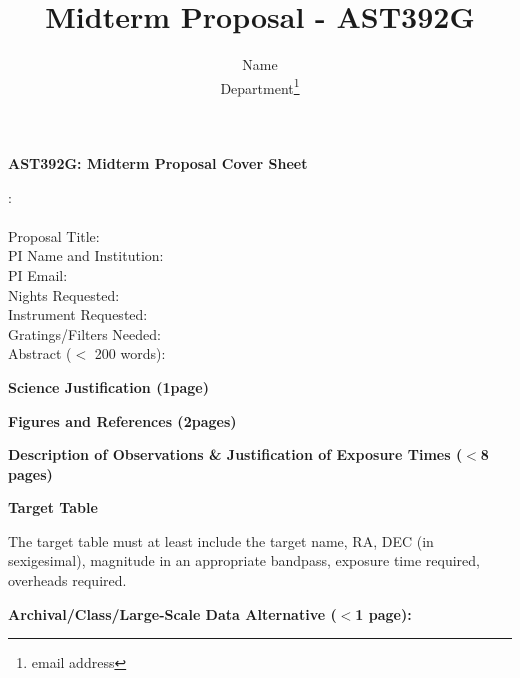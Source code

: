 \documentclass[11pt]{article}
\title{Midterm Proposal - AST392G}
\author{ Name\\  Department\thanks{email address} }
\begin{document}
\begin{center} {\bf \large AST392G: Midterm Proposal Cover Sheet} \end{center}: \\ \\


Proposal Title:  \\

PI Name and Institution:  \\

PI Email:  \\

Nights Requested:  \\

Instrument Requested:  \\

Gratings/Filters Needed:  \\

Abstract ($<$ 200 words):  \\

\pagebreak



\begin{center}{\bf Science Justification (1page)}\end{center}

\newpage
\begin{center}{\bf Figures  and References (2pages) }\end{center}

\newpage
\begin{center}{\bf Description of Observations \& Justification of Exposure Times ($<$8 pages)}
\end{center}

\newpage
\begin{center}{\bf Target Table}\end{center}
The target table must at least include the target name, RA, DEC (in sexigesimal), magnitude in an appropriate bandpass, exposure time required, overheads required.

\newpage
\begin{center}{\bf Archival/Class/Large-Scale Data Alternative ($<$1 page): }\end{center}
\end{document}
